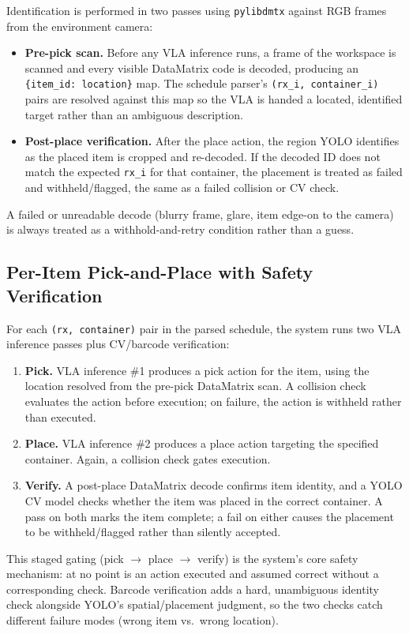 \documentclass[12pt,a4paper]{article}
\begin{document}
Identification is performed in two passes using \texttt{pylibdmtx} against RGB frames from the environment camera:
\begin{itemize}
  \item \textbf{Pre-pick scan.} Before any VLA inference runs, a frame of the workspace is scanned and every visible DataMatrix code is decoded, producing an \texttt{\{item\_id: location\}} map. The schedule parser's \texttt{(rx\_i, container\_i)} pairs are resolved against this map so the VLA is handed a located, identified target rather than an ambiguous description.
  \item \textbf{Post-place verification.} After the place action, the region YOLO identifies as the placed item is cropped and re-decoded. If the decoded ID does not match the expected \texttt{rx\_i} for that container, the placement is treated as failed and withheld/flagged, the same as a failed collision or CV check.
\end{itemize}
A failed or unreadable decode (blurry frame, glare, item edge-on to the camera) is always treated as a withhold-and-retry condition rather than a guess.
 
\subsection{Per-Item Pick-and-Place with Safety Verification}
 
For each \texttt{(rx, container)} pair in the parsed schedule, the system runs two VLA inference passes plus CV/barcode verification:
\begin{enumerate}
  \item \textbf{Pick.} VLA inference \#1 produces a pick action for the item, using the location resolved from the pre-pick DataMatrix scan. A collision check evaluates the action before execution; on failure, the action is withheld rather than executed.
  \item \textbf{Place.} VLA inference \#2 produces a place action targeting the specified container. Again, a collision check gates execution.
  \item \textbf{Verify.} A post-place DataMatrix decode confirms item identity, and a YOLO CV model checks whether the item was placed in the correct container. A pass on both marks the item complete; a fail on either causes the placement to be withheld/flagged rather than silently accepted.
\end{enumerate}
This staged gating (pick $\rightarrow$ place $\rightarrow$ verify) is the system's core safety mechanism: at no point is an action executed and assumed correct without a corresponding check. Barcode verification adds a hard, unambiguous identity check alongside YOLO's spatial/placement judgment, so the two checks catch different failure modes (wrong item vs.\ wrong location).
 
\end{document}

